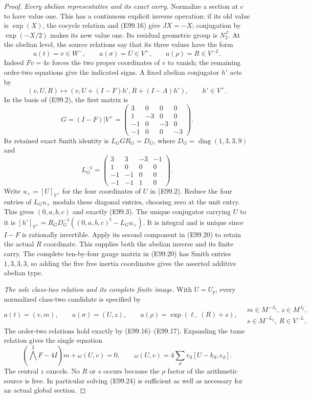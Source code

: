 \begin{proof}
\emph{Every abelian representative and its exact carry.}
Normalize a section at $c$ to have value one. This has
a continuous explicit inverse operation: if its old
value is $\exp(X)$, the cocycle relation and (E99.16)
give $JX=-X$; conjugation by $\exp(-X/2)$ makes its
new value one. Its residual geometric group is $N_2^J$.
At the abelian level, the source relations say that its
three values have the form
\[
       a(t)=v\in W^-,\qquad a(\sigma)=U\in V^+,
                 \qquad a(\rho)=R\in V^{-L}.
 \tag{E99.19}
\]
Indeed $Fv=4v$ forces the two proper coordinates of $v$
to vanish; the remaining order-two equations give the
indicated signs. A fixed abelian conjugator $h'$ acts by
\[
 (v,U,R)\longmapsto
    (v,U+(I-F)h',R+(I-A)h'),\qquad h'\in V^+.
 \tag{E99.20}
\]
In the basis of (E99.2), the first matrix is
\[
 G=(I-F)|V^+=
 \begin{pmatrix}3&0&0&0\\1&-3&0&0\\-1&0&-3&0\\-1&0&0&-3\end{pmatrix}.
 \tag{E99.21}
\]
Its retained exact Smith identity is $L_GGR_G=D_G$,
where $D_G=\operatorname{diag}(1,3,3,9)$ and
\[
 L_G^{-1}=
 \begin{pmatrix}3&3&-3&-1\\1&0&0&0\\-1&-1&0&0\\-1&-1&1&0\end{pmatrix}.
 \tag{E99.22}
\]
Write $u_+=[U]_{V^+}$ for the four coordinates of $U$
in (E99.2). Reduce the four entries of $L_Gu_+$ modulo these diagonal
entries, choosing zero at the unit entry. This gives
$(0,a,b,c)$ and exactly (E99.3). The unique conjugator
carrying $U$ to it is
$[h']_{V^+}=R_GD_G^{-1}((0,a,b,c)^{\mathsf t}-L_Gu_+)$.
It is integral and is unique since
$I-F$ is rationally invertible. Apply its second component
in (E99.20) to retain the actual $R$ coordinate.
This supplies both the abelian inverse and its finite carry.
The complete ten-by-four gauge matrix in (E99.20) has
Smith entries $1,3,3,3$, so adding the five free inertia
coordinates gives the asserted additive abelian type.

\emph{The sole class-two relation and its complete finite image.}
With $U=U_p$, every normalized class-two candidate is
specified by
\[
 a(t)=(v,m),\qquad a(\sigma)=(U,z),\qquad
 a(\rho)=\exp(\ell_-(R)+s),
 \quad
 \begin{matrix}m\in M^{-J_2},\ z\in M^{J_2},\\
                 s\in M^{-L_2},\ R\in V^{-L}.
 \end{matrix}
 \tag{E99.23}
\]
The order-two relations hold exactly by (E99.16)--(E99.17).
Expanding the tame relation gives the single equation
\[
 (\bigwedge^2F-4I)m+\omega(U,v)=0,\qquad
 \omega(U,v)=4\sum_d v_d[U-k_d,e_d].
 \tag{E99.24}
\]
The central $z$ cancels. No $R$ or $s$ occurs because
the $\rho$ factor of the arithmetic source is free.
In particular solving (E99.24) is sufficient as well as
necessary for an actual global section.


\end{proof}
